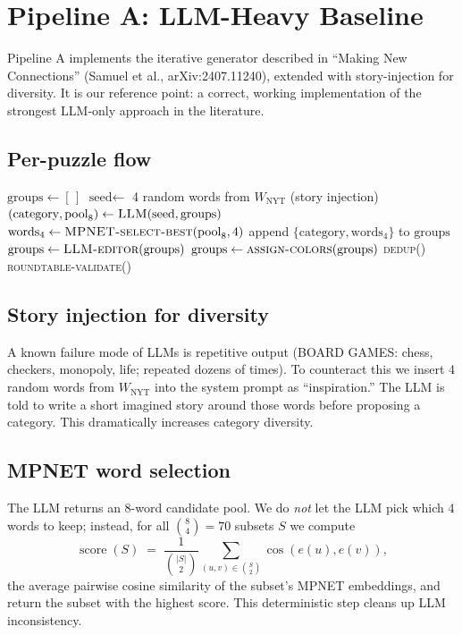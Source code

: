 \documentclass[11pt, letterpaper]{article}
\begin{document}
\section{Pipeline A: LLM-Heavy Baseline}
\label{sec:pipelineA}

Pipeline A implements the iterative generator described in ``Making New Connections''
(Samuel et al., arXiv:2407.11240), extended with story-injection for diversity.
It is our reference point: a correct, working implementation of the strongest
LLM-only approach in the literature.

\subsection{Per-puzzle flow}

\begin{algorithm}[H]
\caption{Pipeline A --- Iterative LLM-heavy generation}
\begin{algorithmic}[1]
\State $\text{groups} \gets [\,]$
    \State $\text{seed} \gets $ 4 random words from $W_\text{NYT}$ (story injection)
    \State $(\text{category}, \text{pool}_8) \gets \textsc{LLM}(\text{seed}, \text{groups})$ 
    \State $\text{words}_4 \gets \textsc{MPNET-select-best}(\text{pool}_8, 4)$
    \State append $\{\text{category}, \text{words}_4\}$ to $\text{groups}$
\EndFor
\State $\text{groups} \gets \textsc{LLM-editor}(\text{groups})$ 
\State $\text{groups} \gets \textsc{assign-colors}(\text{groups})$
\State \textsc{dedup}()
\State \textsc{roundtable-validate}()
\end{algorithmic}
\end{algorithm}

\subsection{Story injection for diversity}
A known failure mode of LLMs is repetitive output (BOARD GAMES: chess, checkers,
monopoly, life; repeated dozens of times). To counteract this we insert 4 random
words from $W_\text{NYT}$ into the system prompt as ``inspiration.'' The LLM is
told to write a short imagined story around those words before proposing a
category. This dramatically increases category diversity.

\subsection{MPNET word selection}
The LLM returns an 8-word candidate pool. We do \emph{not} let the LLM pick which
4 words to keep; instead, for all $\binom{8}{4} = 70$ subsets $S$ we compute
\begin{equation}
\operatorname{score}(S) \;=\; \frac{1}{\binom{|S|}{2}} \sum_{(u,v) \in \binom{S}{2}} \cos(e(u), e(v)),
\end{equation}
the average pairwise cosine similarity of the subset's MPNET embeddings, and return
the subset with the highest score. This deterministic step cleans up LLM
inconsistency.
\end{document}
